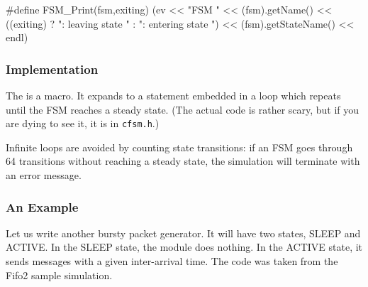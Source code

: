 \begin{cpp}
#define FSM_Print(fsm,exiting)
  (ev << "FSM " << (fsm).getName()
      << ((exiting) ? ": leaving state " : ": entering state ")
      << (fsm).getStateName() << endl)
\end{cpp}


\subsubsection{Implementation}


The  is a macro. It expands to a 
statement embedded in a  loop which repeats until the
FSM reaches a steady state. (The actual code is rather
scary, but if you are dying to see it, it is in \texttt{cfsm.h}.)

Infinite loops are avoided by counting state transitions: if
an FSM goes through 64 transitions without reaching a steady
state, the simulation will terminate with an error message.


\subsubsection{An Example}


Let us write another bursty packet generator. It will have two
states, SLEEP and ACTIVE. In the SLEEP state, the module does
nothing. In the ACTIVE state, it sends messages with a given
inter-arrival time. The code was taken from the Fifo2 sample
simulation.


